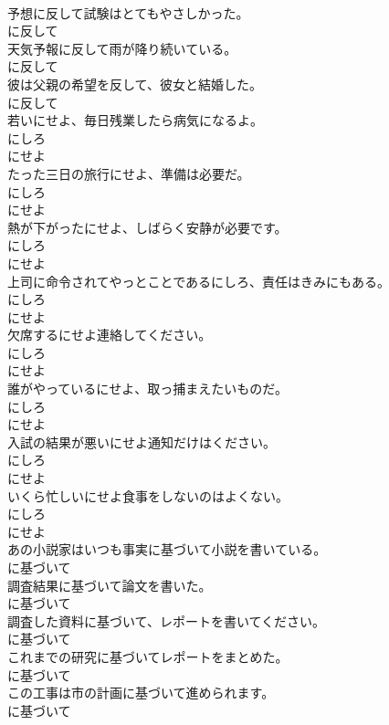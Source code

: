 \documentclass[8pt]{extreport}
\begin{document}
\begin{CJK}{UTF8}{min}
\\	予想に反して試験はとてもやさしかった。	
\\	に反して	
\\	天気予報に反して雨が降り続いている。	
\\	に反して	
\\	彼は父親の希望を反して、彼女と結婚した。	
\\	に反して	
\\	若いにせよ、毎日残業したら病気になるよ。	
\\	にしろ 
\\	にせよ	
\\	たった三日の旅行にせよ、準備は必要だ。	
\\	にしろ 
\\	にせよ	
\\	熱が下がったにせよ、しばらく安静が必要です。	
\\	にしろ 
\\	にせよ	
\\	上司に命令されてやっとことであるにしろ、責任はきみにもある。	
\\	にしろ 
\\	にせよ	
\\	欠席するにせよ連絡してください。	
\\	にしろ 
\\	にせよ	
\\	誰がやっているにせよ、取っ捕まえたいものだ。	
\\	にしろ 
\\	にせよ	
\\	入試の結果が悪いにせよ通知だけはください。	
\\	にしろ 
\\	にせよ	
\\	いくら忙しいにせよ食事をしないのはよくない。	
\\	にしろ 
\\	にせよ	
\\	あの小説家はいつも事実に基づいて小説を書いている。	
\\	に基づいて	
\\	調査結果に基づいて論文を書いた。	
\\	に基づいて	
\\	調査した資料に基づいて、レポートを書いてください。	
\\	に基づいて	
\\	これまでの研究に基づいてレポートをまとめた。	
\\	に基づいて	
\\	この工事は市の計画に基づいて進められます。	
\\	に基づいて	

\end{CJK}
\end{document}
